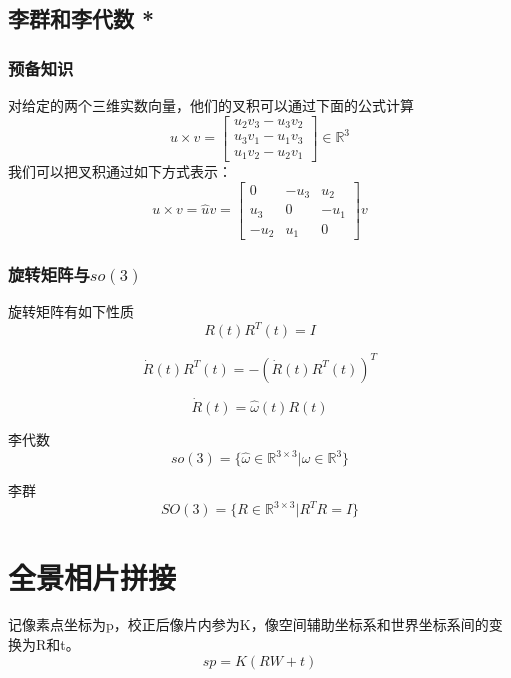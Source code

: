 \documentclass{ctexart}
\begin{document}
	
	\subsection{李群和李代数 *}
	\subsubsection{预备知识}
	对给定的两个三维实数向量，他们的叉积可以通过下面的公式计算
	\begin{equation}
	u \times v =
	\begin{bmatrix}
	u_2 v_3 - u_3 v_2 \\
	u_3 v_1 - u_1 v_3 \\
	u_1 v_2 - u_2 v_1
	\end{bmatrix}
	\in \mathbb{R}^3
	\end{equation}
	我们可以把叉积通过如下方式表示：
	\begin{equation}
	u \times v =
	\hat{u} v =
	\begin{bmatrix}
	0 & -u_3 & u_2 \\
	u_3 & 0 & -u_1 \\
	-u_2 & u_1 & 0
	\end{bmatrix}
	v
	\end{equation}
	\subsubsection{旋转矩阵与$so(3)$}
	旋转矩阵有如下性质
	\begin{equation}
	R(t) R^T(t) = I
	\end{equation}
	
	\begin{equation}
	\dot{R}(t) R^T(t) = -(\dot{R}(t) R^T(t))^T
	\end{equation}
	
	\begin{equation}
	\dot{R}(t) = \hat{\omega}(t) R(t)
	\end{equation}
	
	李代数
	\begin{equation}
	so(3) = \{ \hat{\omega} \in \mathbb{R}^{3\times 3} | \omega \in \mathbb{R}^3 \}
	\end{equation}
	
	李群
	\begin{equation}
	SO(3) = \{ R \in \mathbb{R}^{3\times 3} | R^T R = I \}
	\end{equation}
	
	
	\section{全景相片拼接}
	记像素点坐标为p，校正后像片内参为K，像空间辅助坐标系和世界坐标系间的变换为R和t。
	\begin{equation}
	sp=K(RW+t)
	\end{equation}
	
\end{document}

